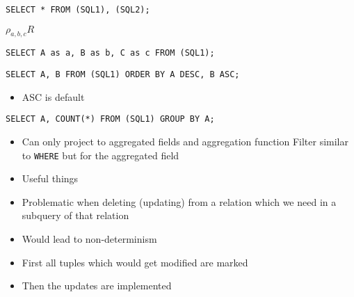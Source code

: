\begin{itemize}
\begin{itemize}
\begin{verbatim}
SELECT * FROM (SQL1), (SQL2);
\end{verbatim}
             $\rho_{a, b, c}R$
\begin{verbatim}
SELECT A as a, B as b, C as c FROM (SQL1);
\end{verbatim}
        \end{itemize}
\begin{verbatim}
SELECT A, B FROM (SQL1) ORDER BY A DESC, B ASC;
\end{verbatim}
        \begin{itemize}
            \item ASC is default
        \end{itemize}
\begin{verbatim}
SELECT A, COUNT(*) FROM (SQL1) GROUP BY A;
\end{verbatim}
        \begin{itemize}
            \item Can only project to aggregated fields and aggregation function
                 Filter similar to \verb+WHERE+ but for the aggregated field
        \end{itemize}
        \begin{itemize}
            \item Useful things
        \end{itemize}
        \begin{itemize}
            \item Problematic when deleting (updating) from a relation which we need in a subquery of that relation
            \item Would lead to non-determinism
            \item First all tuples which would get modified are marked
            \item Then the updates are implemented
        \end{itemize}
\end{itemize}


